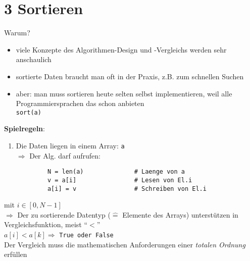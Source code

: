 
        \chapter*{3 Sortieren}

        Warum?
        \begin{itemize}
            \item viele Konzepte des Algorithmen-Design und -Vergleichs werden sehr anschaulich
            \item sortierte Daten braucht man oft in der Praxis, z.B. zum schnellen Suchen
            \item aber: man muss sortieren heute selten selbst implementieren, weil alle Programmiersprachen das schon anbieten \\
            \hspace*{1cm} \verb|sort(a)|
        \end{itemize}

        \textbf{Spielregeln}:
        \begin{enumerate}
            \item Die Daten liegen in einem Array: \verb|a| \\
            $\Rightarrow$ Der Alg. darf aufrufen: \\
        \end{enumerate}
        \vspace*{-5mm}
        \begin{verbatim}
            N = len(a)              # Laenge von a
            v = a[i]                # Lesen von El.i
            a[i] = v                # Schreiben von El.i
        \end{verbatim}

        mit $i \in [0, N-1]$ \\
        $\Rightarrow$ Der zu sortierende Datentyp ($\widehat{=}$ Elemente des Arrays) unterstützen in Vergleichsfunktion, meist ``$<$'' \\
        $a[i] < a[k] \Rightarrow$ \verb|True oder False| \\

        Der Vergleich muss die mathematischen Anforderungen einer \emph{totalen Ordnung} erfüllen \\


